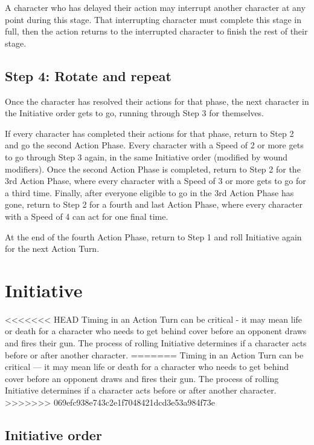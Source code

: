 A character who has delayed their action may interrupt another character at any point during this stage. That interrupting character must complete this stage in full, then the action returns to the interrupted character to finish the rest of their stage.


\subsection{Step 4: Rotate and repeat}
\label{sec:rotate-repeat}

Once the character has resolved their actions for that phase, the next character in the Initiative order gets to go, running through Step 3 for themselves.

If every character has completed their actions for that phase, return to Step 2 and go the second Action Phase. Every character with a Speed of 2 or more gets to go through Step 3 again, in the same Initiative order (modified by wound modifiers). Once the second Action Phase is completed, return to Step 2 for the 3rd Action Phase, where every character with a Speed of 3 or more gets to go for a third time. Finally, after everyone eligible to go in the 3rd Action Phase has gone, return to Step 2 for a fourth and last Action Phase, where every character with a Speed of 4 can act for one final time.

At the end of the fourth Action Phase, return to Step 1 and roll Initiative again for the next Action Turn.


\section{Initiative}
\label{sec:initiative}

<<<<<<< HEAD
Timing in an Action Turn can be critical - it may mean life or death for a character who needs to get behind cover before an opponent draws and fires their gun. The process of rolling Initiative determines if a character acts before or after another character.
=======
Timing in an Action Turn can be critical --- it may mean life or death for a character who needs to get behind cover before an opponent draws and fires their gun. The process of rolling Initiative determines if a character acts before or after another character.
>>>>>>> 069efc938e743c2e1f7048421dcd3e53a984f73e


\subsection{Initiative order}
\label{sec:initiative-order}

